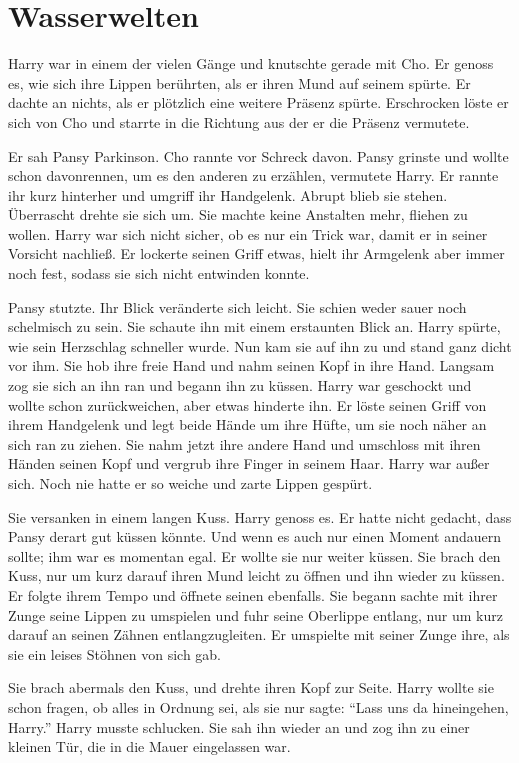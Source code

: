 \chapter{Wasserwelten}


Harry war in einem der vielen Gänge und knutschte gerade mit Cho. Er genoss es, wie sich ihre Lippen berührten, als er ihren Mund auf seinem spürte. Er dachte an nichts, als er plötzlich eine weitere Präsenz spürte. Erschrocken löste er sich von Cho und starrte in die Richtung aus der er die Präsenz vermutete.

Er sah Pansy Parkinson. Cho rannte vor Schreck davon. Pansy grinste und wollte schon davonrennen, um es den anderen zu erzählen, vermutete Harry. Er rannte ihr kurz hinterher und umgriff ihr Handgelenk. Abrupt blieb sie stehen. Überrascht drehte sie sich um. Sie machte keine Anstalten mehr, fliehen zu wollen. Harry war sich nicht sicher, ob es nur ein Trick war, damit er in seiner Vorsicht nachließ. Er lockerte seinen Griff etwas, hielt ihr Armgelenk aber immer noch fest, sodass sie sich nicht entwinden konnte.

Pansy stutzte. Ihr Blick veränderte sich leicht. Sie schien weder sauer noch schelmisch zu sein. Sie schaute ihn mit einem erstaunten Blick an. Harry spürte, wie sein Herzschlag schneller wurde. Nun kam sie auf ihn zu und stand ganz dicht vor ihm. Sie hob ihre freie Hand und nahm seinen Kopf in ihre Hand. Langsam zog sie sich an ihn ran und begann ihn zu küssen. Harry war geschockt und wollte schon zurückweichen, aber etwas hinderte ihn. Er löste seinen Griff von ihrem Handgelenk und legt beide Hände um ihre Hüfte, um sie noch näher an sich ran zu ziehen. Sie nahm jetzt ihre andere Hand und umschloss mit ihren Händen seinen Kopf und vergrub ihre Finger in seinem Haar. Harry war außer sich. Noch nie hatte er so weiche und zarte Lippen gespürt.

Sie versanken in einem langen Kuss. Harry genoss es. Er hatte nicht gedacht, dass Pansy derart gut küssen könnte. Und wenn es auch nur einen Moment andauern sollte; ihm war es momentan egal. Er wollte sie nur weiter küssen. Sie brach den Kuss, nur um kurz darauf ihren Mund leicht zu öffnen und ihn wieder zu küssen. Er folgte ihrem Tempo und öffnete seinen ebenfalls. Sie begann sachte mit ihrer Zunge seine Lippen zu umspielen und fuhr seine Oberlippe entlang, nur um kurz darauf an seinen Zähnen entlangzugleiten. Er umspielte mit seiner Zunge ihre, als sie ein leises Stöhnen von sich gab.

Sie brach abermals den Kuss, und drehte ihren Kopf zur Seite. Harry wollte sie schon fragen, ob alles in Ordnung sei, als sie nur sagte: \enquote{Lass uns da hineingehen, Harry.} Harry musste schlucken. Sie sah ihn wieder an und zog ihn zu einer kleinen Tür, die in die Mauer eingelassen war.


